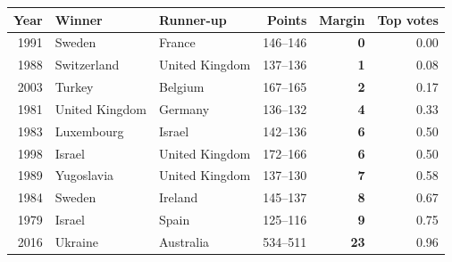 \begin{tabular}{rllrrr}
\toprule
Year & Winner & Runner-up & Points & Margin & Top votes \\
\midrule
1991 & Sweden & France & 146--146 & \textbf{0} & 0.00 \\
1988 & Switzerland & United Kingdom & 137--136 & \textbf{1} & 0.08 \\
2003 & Turkey & Belgium & 167--165 & \textbf{2} & 0.17 \\
1981 & United Kingdom & Germany & 136--132 & \textbf{4} & 0.33 \\
1983 & Luxembourg & Israel & 142--136 & \textbf{6} & 0.50 \\
1998 & Israel & United Kingdom & 172--166 & \textbf{6} & 0.50 \\
1989 & Yugoslavia & United Kingdom & 137--130 & \textbf{7} & 0.58 \\
1984 & Sweden & Ireland & 145--137 & \textbf{8} & 0.67 \\
1979 & Israel & Spain & 125--116 & \textbf{9} & 0.75 \\
2016 & Ukraine & Australia & 534--511 & \textbf{23} & 0.96 \\
\bottomrule
\end{tabular}
